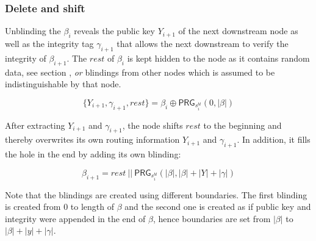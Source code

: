 \subsubsection{Delete and shift}
\label{sec:sphinx:shifting}

Unblinding the $\beta_i$ reveals the public key $Y_{i+1}$ of the next downstream node as well as the integrity tag $\gamma_{i+1}$ that allows the next downstream to verify the integrity of $\beta_{i+1}$. The $rest$ of $\beta_i$ is kept hidden to the node as it contains random data, see section , \textit{or} blindings from other nodes which is assumed to be indistinguishable by that node.

$$ \{ Y_{i+1}, \gamma_{i+1}, rest \} = \beta_i \oplus \textsf{PRG}_{s_i^{bl}}(0, | \beta |) $$

After extracting $Y_{i+1}$ and $\gamma_{i+1}$, the node shifts $rest$ to the beginning and thereby overwrites its own routing information $Y_{i+1}$ and $\gamma_{i+1}$. In addition, it fills the hole in the end by adding its own blinding:

$$ \beta_{i+1} = rest \ || \ \textsf{PRG}_{s_i^{bl}}(| \beta |, | \beta | + |Y| + |\gamma|)$$

Note that the blindings are created using different boundaries. The first blinding is created from 0 to length of $\beta$ and the second one is created as if public key and integrity were appended in the end of $\beta$, hence boundaries are set from $| \beta |$ to $| \beta | + |y| + |\gamma|$.

